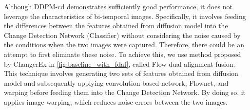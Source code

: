 \documentclass[../main.tex]{subfiles}
\begin{document}
Although DDPM-cd demonstrates sufficiently good performance, it does not leverage the characteristics of bi-temporal images. Specifically, it involves feeding the differences between the features obtained from diffusion model into the Change Detection Network (Classifier) without considering the noise caused by the conditions when the two images were captured. Therefore, there could be an attempt to first eliminate these noise. To achieve this, we use method proposed by ChangerEx in \ref{fig:baseline_with_fdaf}, called Flow dual-alignment fusion.\cite{fang2023changerex} This technique involves generating two sets of features obtained from diffusion model and subsequently applying convolution based network, Flownet, and warping before feeding them into the Change Detection Network. By doing so, it applies image warping, which reduces noise errors between the two images.
\end{document}
